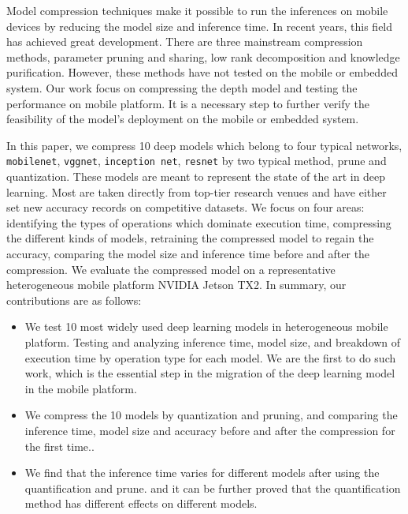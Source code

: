 Model compression techniques make it possible to run 
the inferences on mobile devices by reducing the model size
and inference time. 
In recent years, this field has achieved great development. 
There are three mainstream compression methods,
parameter pruning and sharing\FIXME{\cite{}},
low rank decomposition\FIXME{\cite{}} and
knowledge purification\FIXME{\cite{}}.
However, these methods have not tested on the mobile or embedded system. 
Our work focus on compressing the depth model and  
testing the performance on mobile platform.
It is a necessary step to further verify the
feasibility of the model's deployment on the mobile
or embedded system.

In this paper, we compress 10 deep models which belong to four typical networks,
\texttt{mobilenet}, \texttt{vggnet}, \texttt{inception net}, \texttt{resnet} by two typical method, prune and quantization.
These models are meant to represent the state of
the art in deep learning. Most are
taken directly from top-tier research venues and have either
set new accuracy records on competitive datasets.
We focus on four areas: identifying the types of operations
which dominate execution time, compressing the different kinds of models,
retraining the compressed model to regain the accuracy,
comparing the model size and inference time before and after the compression. 
We evaluate the compressed model on a representative heterogeneous mobile platform
NVIDIA Jetson TX2. In summary, our contributions are as follows:


\begin{itemize}
\item We test 10 most widely used deep 
learning models in heterogeneous mobile platform.
Testing and analyzing inference time, model size, and 
breakdown of execution time by operation type for each model.
We are the first to do such work,  
which is the essential step in the migration of the 
deep learning model in the mobile platform.
\item We compress the 10 models by quantization and pruning, and 
comparing the inference time, model size and accuracy before and 
after the compression for the first time.. 
\item We find that the inference 
time varies for different models after using the quantification and prune.
and it can be further proved that the quantification 
method has different effects on different models.
\end{itemize}


